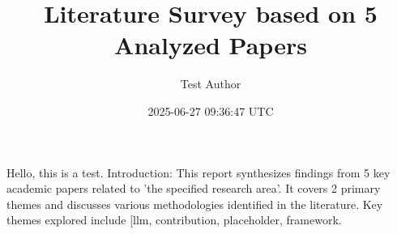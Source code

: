 \documentclass{article}
\title{Literature Survey based on 5 Analyzed Papers}
\author{Test Author}
\date{2025-06-27 09:36:47 UTC}
\begin{document}
\maketitle
Hello, this is a test.
Introduction: This report synthesizes findings from 5 key academic papers related to 'the specified research area'. It covers 2 primary themes and discusses various methodologies identified in the literature. Key themes explored include [llm, contribution, placeholder, framework.
\end{document}
